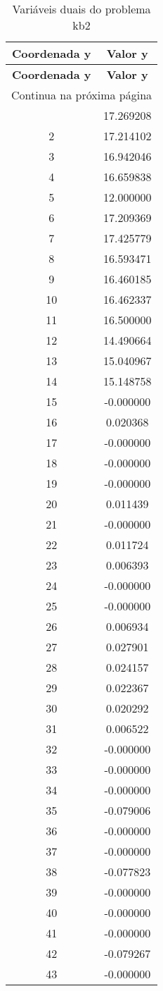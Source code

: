 \documentclass[12pt]{article}
\begin{document}
\begin{longtable}{@{}cc@{}}
\caption{Variáveis duais do problema kb2} \\
\toprule
\textbf{Coordenada y} & \textbf{Valor y} \\
\midrule
\endfirsthead

\toprule
\textbf{Coordenada y} & \textbf{Valor y} \\
\midrule
\endhead

\midrule \multicolumn{2}{r}{{Continua na próxima página}} \\ \midrule
\endfoot

\bottomrule
\endlastfoot
1 & 17.269208 \\
2 & 17.214102 \\
3 & 16.942046 \\
4 & 16.659838 \\
5 & 12.000000 \\
6 & 17.209369 \\
7 & 17.425779 \\
8 & 16.593471 \\
9 & 16.460185 \\
10 & 16.462337 \\
11 & 16.500000 \\
12 & 14.490664 \\
13 & 15.040967 \\
14 & 15.148758 \\
15 & -0.000000 \\
16 & 0.020368 \\
17 & -0.000000 \\
18 & -0.000000 \\
19 & -0.000000 \\
20 & 0.011439 \\
21 & -0.000000 \\
22 & 0.011724 \\
23 & 0.006393 \\
24 & -0.000000 \\
25 & -0.000000 \\
26 & 0.006934 \\
27 & 0.027901 \\
28 & 0.024157 \\
29 & 0.022367 \\
30 & 0.020292 \\
31 & 0.006522 \\
32 & -0.000000 \\
33 & -0.000000 \\
34 & -0.000000 \\
35 & -0.079006 \\
36 & -0.000000 \\
37 & -0.000000 \\
38 & -0.077823 \\
39 & -0.000000 \\
40 & -0.000000 \\
41 & -0.000000 \\
42 & -0.079267 \\
43 & -0.000000 \\

\end{longtable}
\end{document}

